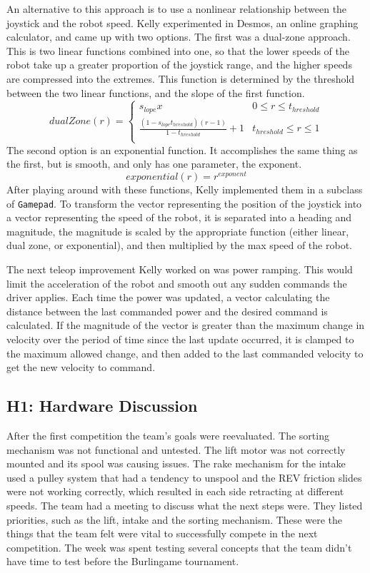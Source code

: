 \documentclass{article}
\begin{document}
An alternative to this approach is to use a nonlinear relationship between the joystick and the robot speed. Kelly experimented in Desmos, an online graphing calculator, and came up with two options. The first was a dual-zone approach. This is two linear functions combined into one, so that the lower speeds of the robot take up a greater proportion of the joystick range, and the higher speeds are compressed into the extremes. This function is determined by the threshold between the two linear functions, and the slope of the first function.
\begin{equation}
dualZone(r) = 
\begin{cases} 
      s_{lope}x & 0 \leq r \leq t_{hreshold}\\
      \frac{(1-s_{lope}t_{hreshold})(r-1)}{1-t_{hreshold}} +1& t_{hreshold} \leq r \leq 1 \\
  \end{cases}
\end{equation}
The second option is an exponential function. It accomplishes the same thing as the first, but is smooth, and only has one parameter, the exponent. 
\begin{equation}
    exponential(r) = r^{exponent}
\end{equation}
After playing around with these functions, Kelly implemented them in a subclass of \texttt{Gamepad}. To transform the vector representing the position of the joystick into a vector representing the speed of the robot, it is separated into a heading and magnitude, the magnitude is scaled by the appropriate function (either linear, dual zone, or exponential), and then multiplied by the max speed of the robot. 

The next teleop improvement Kelly worked on was power ramping. This would limit the acceleration of the robot and smooth out any sudden commands the driver applies. Each time the power was updated, a vector calculating the distance between the last commanded power and the desired command is calculated. If the magnitude of the vector is greater than the maximum change in velocity over the period of time since the last update occurred, it is clamped to the maximum allowed change, and then added to the last commanded velocity to get the new velocity to command. 
\subsection{H1: Hardware Discussion}

After the first competition the team's goals were reevaluated. The sorting mechanism was not functional and untested. The lift motor was not correctly mounted and its spool was causing issues. The rake mechanism for the intake used a pulley system that had a tendency to unspool and the REV friction slides were not working correctly, which resulted in each side retracting at different speeds. The team had a meeting to discuss what the next steps were. They listed priorities, such as the lift, intake and the sorting mechanism. These were the things that the team felt were vital to successfully compete in the next competition. The week was spent testing several concepts that the team didn't have time to test before the Burlingame tournament. \\
\end{document}
